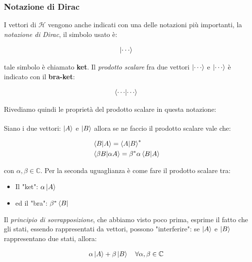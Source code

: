 	
\begin{myapprf}

\subsubsection{Notazione di Dirac}
	
	I vettori di $\mathcal{H}$ vengono anche indicati con una delle notazioni più importanti, la \textit{notazione di Dirac}, il simbolo usato è:
	
\begin{align*}
	\ket{\cdots}
\end{align*}
	
	tale simbolo è chiamato \textbf{ket}. Il \textit{prodotto scalare} fra due vettori $\ket{\cdots}$ e $\ket{\cdots}$ è indicato con il \textbf{bra-ket}:
	
\begin{align*}
	\braket{\cdots}{\cdots}
\end{align*}

	Rivediamo quindi le proprietà del prodotto scalare in questa notazione:
	\\
	\\
	Siano i due vettori: $\ket{A}$ e $\ket{B}$ allora se ne faccio il prodotto scalare vale che:

\begin{align*}
	&\braket{B}{A} = \braket{A}{B}^* \\
	&\braket{\beta B}{\alpha A} = \beta^* \alpha \braket{B}{A}
\end{align*}
	
	con $\alpha, \beta \in \mathbb{C}$. Per la seconda uguaglianza è come fare il prodotto scalare tra:

\begin{itemize}
	\item Il "ket": $\alpha \ket{A}$
	\item ed il "bra": $\beta^* \bra{B}$
	
\end{itemize}

\end{myapprf}

	Il \textit{principio di sovrapposizione}, che abbiamo visto poco prima, esprime il fatto che gli stati, essendo rappresentati da vettori, possono "interferire": se $\ket{A}$ e $\ket{B}$ rappresentano due stati, allora:
	
\begin{align*}
	\alpha \ket{A} + \beta \ket{B} \quad \forall \alpha, \beta \in \mathbb{C}
\end{align*} 

